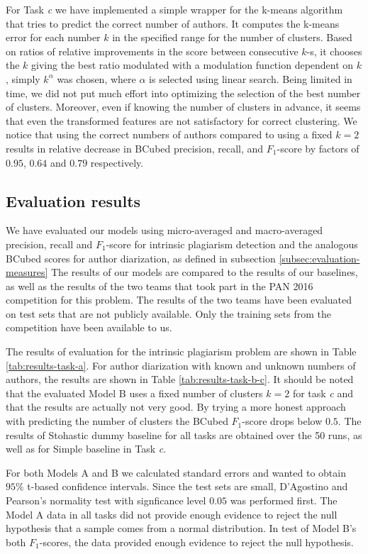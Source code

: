 \documentclass[10pt, a4paper]{article}
\begin{document}
For Task \emph{c} we have implemented a simple wrapper for the k-means algorithm that tries to predict the correct number of authors. It computes the k-means error for each number $k$ in the specified range for the number of clusters. Based on ratios of relative improvements in the score between consecutive $k$-s, it chooses the $k$ giving the best ratio modulated with a modulation function dependent on $k$, simply $k^\alpha$ was chosen, where $\alpha$ is selected using linear search. Being limited in time, we did not put much effort into optimizing the selection of the best number of clusters. Moreover, even if knowing the number of clusters in advance, it seems that even the transformed features are not satisfactory for correct clustering. We notice that using the correct numbers of authors compared to using a fixed $k=2$ results in relative decrease in BCubed precision, recall, and $F_1$-score by factors of $0.95$, $0.64$ and $0.79$ respectively.

\subsection{Evaluation results}

We have evaluated our models using micro-averaged and macro-averaged precision, recall and $F_1$-score for intrinsic plagiarism detection and the analogous BCubed scores for author diarization, as defined in subsection \ref{subsec:evaluation-measures} The results of our models are compared to the results of our baselines, as well as the results of the two teams that took part in the PAN 2016 competition for this problem. The results of the two teams have been evaluated on test sets that are not publicly available. Only the training sets from the competition have been available to us.

The results of evaluation for the intrinsic plagiarism problem are shown in Table \ref{tab:results-task-a}. For author diarization with known and unknown numbers of authors, the results are shown in Table \ref{tab:results-task-b-c}. It should be noted that the evaluated Model B uses a fixed number of clusters $k=2$ for task \emph{c} and that the results are actually not very good. By trying a more honest approach with predicting the number of clusters the BCubed $F_1$-score drops below $0.5$. The results of Stohastic dummy baseline for all tasks are obtained over the 50 runs, as well as for Simple baseline in Task \emph{c}.

For both Models A and B we calculated standard errors and wanted to obtain $95\%$ t-based confidence intervals. Since the test sets are small, D’Agostino and Pearson’s normality test with signficance level $0.05$ was performed first. The Model A data in all tasks did not provide enough evidence to reject the null hypothesis that a sample comes from a normal distribution. In test of Model B's both $F_1$-scores, the data provided enough evidence to reject the null hypothesis.
\end{document}
